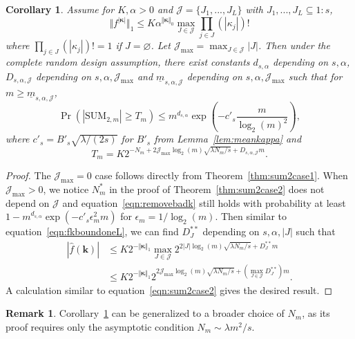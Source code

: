 \documentclass{article}
\newtheorem{corollary}{Corollary}
\theoremstyle{definition}
\newtheorem{remark}{Remark}
\renewcommand{\le}{\leqslant}
\renewcommand{\leq}{\leqslant}
\renewcommand{\geq}{\geqslant}
\renewcommand{\emptyset}{\varnothing}
\newcommand{\cj}{\mathcal{J}}
\newcommand{\bsk}{\boldsymbol{k}}
\newcommand{\bskappa}{\boldsymbol{\kappa}}
\begin{document}
\begin{corollary}\label{cor:SUM2bound}
 Assume for $K,\alpha>0$ and  $\cj=\{J_1,...,J_L\}$ with $J_1,...,J_L\subseteq 1{:}s$, 
 \begin{equation}\label{eqn:fdassumption}
     \Vert f^{|\bskappa|}\Vert_1\leq K\alpha^{\Vert\bskappa\Vert_0}\max_{J\in \cj} \prod_{j\in J} (|\kappa_j|)!
 \end{equation}
 where $\prod_{j\in J} (|\kappa_j|)!=1$ if $J=\emptyset$. Let $\cj_{\max}=\max_{J\in \cj}|J|$. Then under the complete random design assumption, there exist constants $d_{s,\alpha}$ depending on $s,\alpha$, $D_{s,\alpha,\cj}$ depending on $s,\alpha,\cj_{\max}$ and $\underline{m}_{s,\alpha,\cj}$ depending on $s,\alpha,\cj_{\max}$ such that for $m\geq \underline{m}_{s,\alpha,\cj}$, 
$$\Pr(|\mathrm{SUM}_{2,m}|\geq T_m)\leq m^{d_{s,\alpha}}\exp\left(-c'_s \frac{m}{\log_2(m)^2}\right),$$
where $c'_s=B'_s \sqrt{\lambda/(2s)}$ for $B'_s$ from Lemma~\ref{lem:meankappa} and
\begin{equation}\label{eqn:am}
    T_m=K2^{-N_m+2 \cj_{\max}\log_2(m)\sqrt{\lambda N_m/s}+D_{s,\alpha,\cj}m}.
\end{equation}
\end{corollary}
\begin{proof}
The $\cj_{\max}=0$ case follows directly from Theorem~\ref{thm:sum2case1}. When $\cj_{\max}>0$, we notice $N^*_m$ in the proof of Theorem~\ref{thm:sum2case2} does not depend on $\cj$ and equation~\eqref{eqn:removebadk} still holds with probability at least $1-m^{d_{s,\alpha}} \exp(-c'_s\epsilon^2_m m)$ for $\epsilon_m=1/\log_2(m)$. Then similar to equation~\eqref{eqn:fkboundoneL}, we can find $D^{**}_J$ depending on $s,\alpha,|J|$ such that
\begin{align}\label{eqn:fkboundmultiL}
    |\hat{f}(\bsk)|&\le K 2^{-\Vert\bskappa\Vert_1} \max_{J\in \cj} 2^{2 |J| \log_2(m)\sqrt{\lambda N_m/s}+D^{**}_J m}\\
    &\leq K 2^{-\Vert\bskappa\Vert_1} 2^{2 \cj_{\max} \log_2(m)\sqrt{\lambda N_m/s}+(\max_{J\in\cj}D^{**}_J) m}.\nonumber
\end{align}
A calculation similar to equation~\eqref{eqn:sum2case2} gives the desired result.
\end{proof}

\begin{remark}\label{rmk:generalNm}
Corollary~\ref{cor:SUM2bound} can be generalized to a broader choice of $N_m$, as its proof requires only the asymptotic condition $N_m\sim \lambda m^2/s$.
\end{remark}
\end{document}
